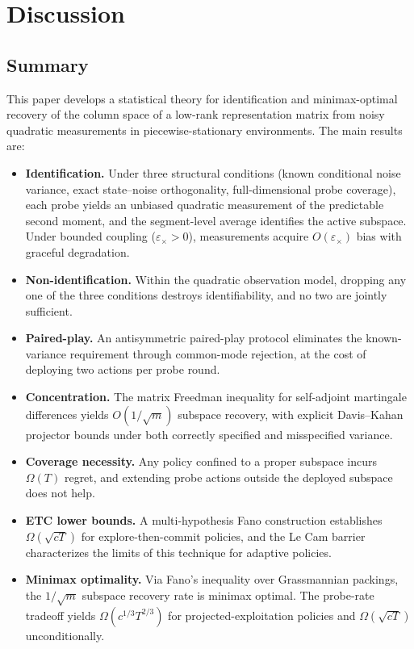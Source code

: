 \documentclass[12pt]{article}
\theoremstyle{plain}
\theoremstyle{definition}
\begin{document}
\section{Discussion}
\label{sec:discussion}

\subsection{Summary}

This paper develops a statistical theory for identification and minimax-optimal recovery of the column space of a low-rank representation matrix from noisy quadratic measurements in piecewise-stationary environments. The main results are:

\begin{itemize}
\item \textbf{Identification.} Under three structural conditions (known conditional noise variance, exact state--noise orthogonality, full-dimensional probe coverage), each probe yields an unbiased quadratic measurement of the predictable second moment, and the segment-level average identifies the active subspace. Under bounded coupling ($\varepsilon_\times > 0$), measurements acquire $O(\varepsilon_\times)$ bias with graceful degradation.

\item \textbf{Non-identification.} Within the quadratic observation model, dropping any one of the three conditions destroys identifiability, and no two are jointly sufficient.

\item \textbf{Paired-play.} An antisymmetric paired-play protocol eliminates the known-variance requirement through common-mode rejection, at the cost of deploying two actions per probe round.

\item \textbf{Concentration.} The matrix Freedman inequality for self-adjoint martingale differences yields $O(1/\sqrt{m})$ subspace recovery, with explicit Davis--Kahan projector bounds under both correctly specified and misspecified variance.

\item \textbf{Coverage necessity.} Any policy confined to a proper subspace incurs $\Omega(T)$ regret, and extending probe actions outside the deployed subspace does not help.

\item \textbf{ETC lower bounds.} A multi-hypothesis Fano construction establishes $\Omega(\sqrt{cT})$ for explore-then-commit policies, and the Le Cam barrier characterizes the limits of this technique for adaptive policies.

\item \textbf{Minimax optimality.} Via Fano's inequality over Grassmannian packings, the $1/\sqrt{m}$ subspace recovery rate is minimax optimal. The probe-rate tradeoff yields $\Omega(c^{1/3}T^{2/3})$ for projected-exploitation policies and $\Omega(\sqrt{cT})$ unconditionally.
\end{itemize}
\end{document}
